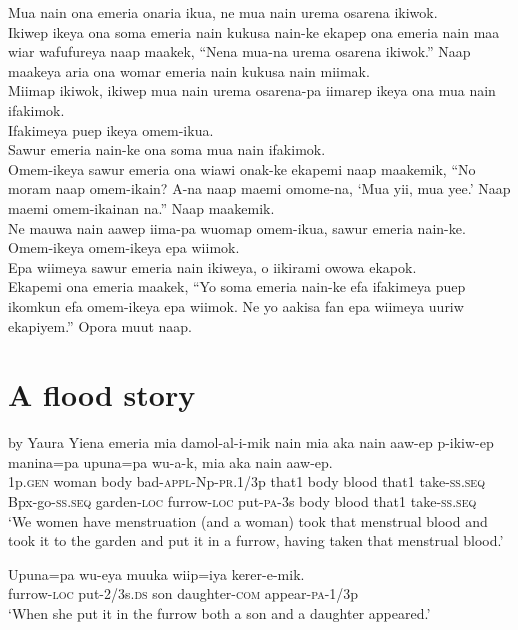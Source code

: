 Mua nain ona emeria onaria ikua, ne mua nain urema osarena ikiwok. \\
\textrm{Ikiwep ikeya ona soma emeria nain kukusa nain-ke ekapep ona emeria nain maa wiar wafufureya naap maakek, “Nena mua-na urema osarena ikiwok.”  }
Naap maakeya aria ona womar emeria nain kukusa nain miimak. \\
Miimap ikiwok, ikiwep mua nain urema osarena-pa iimarep ikeya ona mua nain ifakimok. \\
Ifakimeya puep ikeya omem-ikua. \\
Sawur emeria nain-ke ona soma mua nain ifakimok. \\
\textrm{Omem-ikeya sawur emeria ona wiawi onak-ke ekapemi naap maakemik, “No moram naap omem-ikain?  }
\textrm{A-na naap maemi omome-na, ‘Mua yii, mua yee.’ }
\textrm{Naap maemi omem-ikainan na.”  }
Naap maakemik. \\
Ne mauwa nain aawep iima-pa wuomap omem-ikua, sawur emeria nain-ke. \\
Omem-ikeya omem-ikeya epa wiimok. \\
Epa wiimeya sawur emeria nain ikiweya, o iikirami owowa ekapok. \\
\textrm{Ekapemi ona emeria maakek, “Yo soma emeria nain-ke efa ifakimeya puep ikomkun efa omem-ikeya epa wiimok.  }
\textrm{Ne yo aakisa fan epa wiimeya uuriw ekapiyem.”  }
Opora muut naap. \\ 
\setcounter{equation}{0}
\section{A flood story}  by Yaura
\ea
\gll  Yiena  emeria  mia  damol-al-i-mik  nain  mia  aka  nain      aaw-ep  p-ikiw-ep  manina=pa  upuna=pa  wu-a-k,               mia  aka  nain  aaw-ep. \\
1p.\textsc{gen}  woman  body  bad-\textsc{appl}-Np-\textsc{pr}.1/3p  that1  body  blood  that1 take-\textsc{ss.seq}  Bpx-go-\textsc{ss.seq}  garden-\textsc{loc}  furrow-\textsc{loc}  put-\textsc{pa}-3s body  blood  that1  take-\textsc{ss.seq} \\




\glt ‘We women have menstruation (and a woman) took that menstrual blood and took it to the garden and put it in a furrow, having taken that menstrual blood.’ \\
\z


\ea
\gll  Upuna=pa  wu-eya  muuka  wiip=iya  kerer-e-mik. \\
furrow-\textsc{loc}  put-2/3s.\textsc{ds}  son  daughter-\textsc{com}  appear-\textsc{pa}-1/3p \\
\glt ‘When she put it in the furrow both a son and a daughter appeared.’ \\
\z


